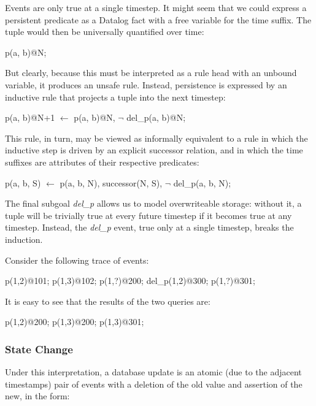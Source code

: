 Events are only true at a single timestep.  It might seem that we could express a persistent predicate as a Datalog fact with a free variable 
for the time suffix.  The tuple would then be universally quantified over time:

\begin{Dedalus}
p(a, b)@N;
\end{Dedalus}

But clearly, because this must be interpreted as a rule head with an unbound variable, it produces an unsafe rule.  Instead, persistence is
expressed by an inductive rule that projects a tuple into the next timestep:

\begin{Dedalus}
p(a, b)@N+1 \(\leftarrow\)
  p(a, b)@N, 
  \(\lnot\) del\_p(a, b)@N;
\end{Dedalus}

This rule, in turn, may be viewed as informally equivalent to a rule in which the inductive step is driven by an 
explicit successor relation, and in which the time suffixes are attributes of their respective predicates:

\begin{Dedalus}
p(a, b, S) \(\leftarrow\)
  p(a, b, N),
  successor(N, S), 
  \(\lnot\) del\_p(a, b, N);
\end{Dedalus}

The final subgoal \emph{del\_p} allows us to model overwriteable storage: without it, a tuple will be trivially true at every future timestep if it becomes true
at any timestep.  Instead, the \emph{del_p} event, true only at a single timestep, breaks the induction.

Consider the following trace of events:

\begin{Dedalus}
p(1,2)@101;
p(1,3)@102;
p(1,?)@200;
del_p(1,2)@300;
p(1,?)@301;
\end{Dedalus}

It is easy to see that the results of the two queries are:


\begin{Dedalus}
p(1,2)@200;
p(1,3)@200;
p(1,3)@301;
\end{Dedalus}

\subsubsection{State Change}

Under this interpretation, a database update is an atomic (due to the adjacent timestamps)
pair of events with a deletion of the old value and assertion of the new, in the form:

